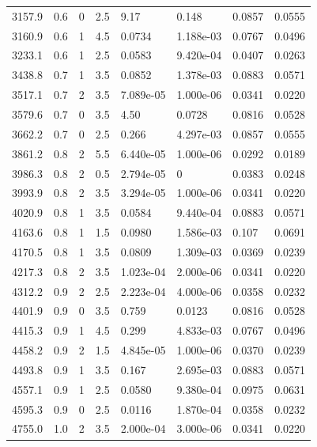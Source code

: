 \documentclass[preview]{standalone}
\begin{document}
{{{\begin{tabular}{L{1.2cm}C{1.2cm} C{0.3cm}C{0.5cm} C{1.4cm}C{1.4cm} C{1.4cm}C{1.4cm}}
  3157.9  &   0.6  & 0     & 2.5 &  9.17  & 0.148  & 0.0857 &  0.0555   \\ 
  3160.9  &   0.6  & 1     & 4.5 &  0.0734  & 1.188e-03  & 0.0767 &  0.0496   \\ 
  3233.1  &   0.6  & 1     & 2.5 &  0.0583  & 9.420e-04  & 0.0407 &  0.0263   \\ 
  3438.8  &   0.7  & 1     & 3.5 &  0.0852  & 1.378e-03  & 0.0883 &  0.0571   \\ 
  3517.1  &   0.7  & 2     & 3.5 &  7.089e-05  & 1.000e-06  & 0.0341 &  0.0220   \\ 
  3579.6  &   0.7  & 0     & 3.5 &  4.50  & 0.0728  & 0.0816 &  0.0528   \\ 
  3662.2  &   0.7  & 0     & 2.5 &  0.266  & 4.297e-03  & 0.0857 &  0.0555   \\ 
  3861.2  &   0.8  & 2     & 5.5 &  6.440e-05  & 1.000e-06  & 0.0292 &  0.0189   \\ 
  3986.3  &   0.8  & 2     & 0.5 &  2.794e-05  & 0  & 0.0383 &  0.0248   \\ 
  3993.9  &   0.8  & 2     & 3.5 &  3.294e-05  & 1.000e-06  & 0.0341 &  0.0220   \\ 
  4020.9  &   0.8  & 1     & 3.5 &  0.0584  & 9.440e-04  & 0.0883 &  0.0571   \\ 
  4163.6  &   0.8  & 1     & 1.5 &  0.0980  & 1.586e-03  & 0.107 &  0.0691   \\ 
  4170.5  &   0.8  & 1     & 3.5 &  0.0809  & 1.309e-03  & 0.0369 &  0.0239   \\ 
  4217.3  &   0.8  & 2     & 3.5 &  1.023e-04  & 2.000e-06  & 0.0341 &  0.0220   \\ 
  4312.2  &   0.9  & 2     & 2.5 &  2.223e-04  & 4.000e-06  & 0.0358 &  0.0232   \\ 
  4401.9  &   0.9  & 0     & 3.5 &  0.759  & 0.0123  & 0.0816 &  0.0528   \\ 
  4415.3  &   0.9  & 1     & 4.5 &  0.299  & 4.833e-03  & 0.0767 &  0.0496   \\ 
  4458.2  &   0.9  & 2     & 1.5 &  4.845e-05  & 1.000e-06  & 0.0370 &  0.0239   \\ 
  4493.8  &   0.9  & 1     & 3.5 &  0.167  & 2.695e-03  & 0.0883 &  0.0571   \\ 
  4557.1  &   0.9  & 1     & 2.5 &  0.0580  & 9.380e-04  & 0.0975 &  0.0631   \\ 
  4595.3  &   0.9  & 0     & 2.5 &  0.0116  & 1.870e-04  & 0.0358 &  0.0232   \\ 
  4755.0  &   1.0  & 2     & 3.5 &  2.000e-04  & 3.000e-06  & 0.0341 &  0.0220   \\ 

\end{tabular}}}}
\end{document}
